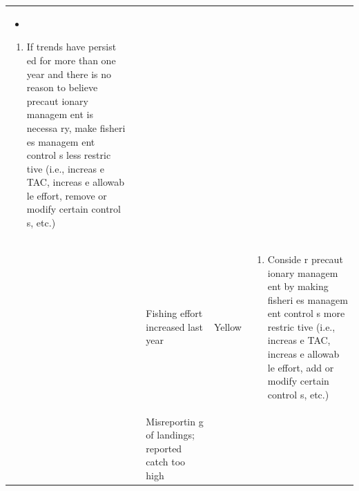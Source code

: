 \documentclass[]{book}
\providecommand{\tightlist}{%
  \setlength{\itemsep}{0pt}\setlength{\parskip}{0pt}}
\begin{document}
\begin{longtable}[]{@{}lllll@{}}
\begin{minipage}[t]{0.19\columnwidth}
\begin{itemize}
\item
\end{itemize}

\begin{enumerate}
\def\labelenumi{\arabic{enumi}.}
\setcounter{enumi}{1}
\tightlist
\item
  If trends have persist ed for more than one year and there is no
  reason to believe precaut ionary managem ent is necessa ry, make
  fisheri es managem ent control s less restric tive (i.e., increas e
  TAC, increas e allowab le effort, remove or modify certain control s,
  etc.)
\end{enumerate}\strut
\end{minipage}\tabularnewline
\begin{minipage}[t]{0.19\columnwidth}\raggedright\strut
\strut
\end{minipage} & \begin{minipage}[t]{0.19\columnwidth}\raggedright\strut
\strut
\end{minipage} & \begin{minipage}[t]{0.19\columnwidth}\raggedright\strut
Fishing effort increased last year\strut
\end{minipage} & \begin{minipage}[t]{0.19\columnwidth}\raggedright\strut
Yellow\strut
\end{minipage} & \begin{minipage}[t]{0.19\columnwidth}\raggedright\strut
\begin{enumerate}
\def\labelenumi{\arabic{enumi}.}
\tightlist
\item
  Conside r precaut ionary managem ent by making fisheri es managem ent
  control s more restric tive (i.e., increas e TAC, increas e allowab le
  effort, add or modify certain control s, etc.)
\end{enumerate}\strut
\end{minipage}\tabularnewline
\begin{minipage}[t]{0.19\columnwidth}\raggedright\strut
\strut
\end{minipage} & \begin{minipage}[t]{0.19\columnwidth}\raggedright\strut
\strut
\end{minipage} & \begin{minipage}[t]{0.19\columnwidth}\raggedright\strut
Misreportin g of landings; reported catch too high\strut
\end{minipage} & \begin{minipage}[t]{0.19\columnwidth}\raggedright\strut

\end{minipage}
\end{longtable}
\end{document}
